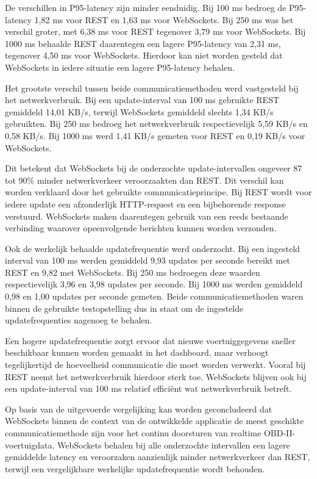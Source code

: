 De verschillen in P95-latency zijn minder eenduidig. Bij 100 ms bedroeg de
P95-latency 1,82 ms voor REST en 1,63 ms voor WebSockets. Bij 250 ms was het
verschil groter, met 6,38 ms voor REST tegenover 3,79 ms voor WebSockets.
Bij 1000 ms behaalde REST daarentegen een lagere P95-latency van 2,31 ms,
tegenover 4,50 ms voor WebSockets. Hierdoor kan niet worden gesteld dat
WebSockets in iedere situatie een lagere P95-latency behalen.

Het grootste verschil tussen beide communicatiemethoden werd vastgesteld bij
het netwerkverbruik. Bij een update-interval van 100 ms gebruikte REST
gemiddeld 14,01 KB/s, terwijl WebSockets gemiddeld slechts 1,34 KB/s
gebruikten. Bij 250 ms bedroeg het netwerkverbruik respectievelijk
5,59 KB/s en 0,58 KB/s. Bij 1000 ms werd 1,41 KB/s gemeten voor REST en
0,19 KB/s voor WebSockets.

Dit betekent dat WebSockets bij de onderzochte update-intervallen ongeveer
87 tot 90\% minder netwerkverkeer veroorzaakten dan REST. Dit verschil kan
worden verklaard door het gebruikte communicatieprincipe. Bij REST wordt voor
iedere update een afzonderlijk HTTP-request en een bijbehorende response
verstuurd. WebSockets maken daarentegen gebruik van een reeds bestaande
verbinding waarover opeenvolgende berichten kunnen worden verzonden.

Ook de werkelijk behaalde updatefrequentie werd onderzocht. Bij een ingesteld
interval van 100 ms werden gemiddeld 9,93 updates per seconde bereikt met REST
en 9,82 met WebSockets. Bij 250 ms bedroegen deze waarden respectievelijk
3,96 en 3,98 updates per seconde. Bij 1000 ms werden gemiddeld 0,98 en
1,00 updates per seconde gemeten. Beide communicatiemethoden waren binnen de
gebruikte testopstelling dus in staat om de ingestelde updatefrequenties
nagenoeg te behalen.

Een hogere updatefrequentie zorgt ervoor dat nieuwe voertuiggegevens sneller
beschikbaar kunnen worden gemaakt in het dashboard, maar verhoogt tegelijkertijd
de hoeveelheid communicatie die moet worden verwerkt. Vooral bij REST neemt
het netwerkverbruik hierdoor sterk toe. WebSockets blijven ook bij een
update-interval van 100 ms relatief efficiënt wat netwerkverbruik betreft.

Op basis van de uitgevoerde vergelijking kan worden geconcludeerd dat
WebSockets binnen de context van de ontwikkelde applicatie de meest geschikte
communicatiemethode zijn voor het continu doorsturen van realtime
OBD-II-voertuigdata. WebSockets behalen bij alle onderzochte intervallen een
lagere gemiddelde latency en veroorzaken aanzienlijk minder netwerkverkeer dan
REST, terwijl een vergelijkbare werkelijke updatefrequentie wordt behouden.

